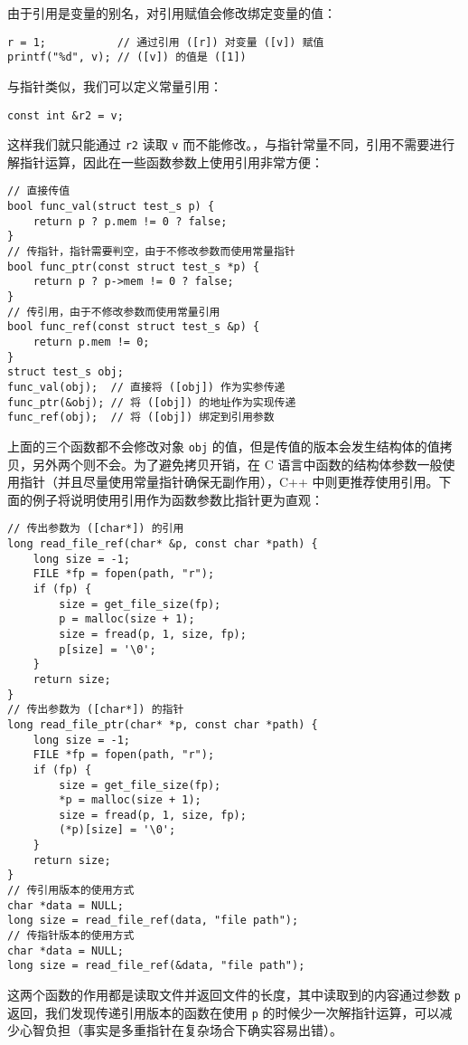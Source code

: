 \documentclass[hyperref,UTF8]{article}
\begin{document}
由于引用是变量的别名，对引用赋值会修改绑定变量的值：
\begin{lstlisting}
r = 1;           // 通过引用 ([r]) 对变量 ([v]) 赋值
printf("%d", v); // ([v]) 的值是 ([1])
\end{lstlisting}
与指针类似，我们可以定义常量引用：
\begin{lstlisting}[numbers=none]
const int &r2 = v;
\end{lstlisting}
这样我们就只能通过 \texttt{r2} 读取 \texttt{v} 而不能修改。，与指针常量不同，引用不需要进行解指针运算，因此在一些函数参数上使用引用非常方便：
\begin{lstlisting}
// 直接传值
bool func_val(struct test_s p) {
    return p ? p.mem != 0 ? false;
}
// 传指针，指针需要判空，由于不修改参数而使用常量指针
bool func_ptr(const struct test_s *p) {
    return p ? p->mem != 0 ? false;
}
// 传引用，由于不修改参数而使用常量引用
bool func_ref(const struct test_s &p) {
    return p.mem != 0;
}
struct test_s obj;
func_val(obj);  // 直接将 ([obj]) 作为实参传递
func_ptr(&obj); // 将 ([obj]) 的地址作为实现传递
func_ref(obj);  // 将 ([obj]) 绑定到引用参数
\end{lstlisting}
上面的三个函数都不会修改对象 \texttt{obj} 的值，但是传值的版本会发生结构体的值拷贝，另外两个则不会。为了避免拷贝开销，在 C 语言中函数的结构体参数一般使用指针（并且尽量使用常量指针确保无副作用），C++ 中则更推荐使用引用。下面的例子将说明使用引用作为函数参数比指针更为直观：
\begin{lstlisting}
// 传出参数为 ([char*]) 的引用
long read_file_ref(char* &p, const char *path) {
    long size = -1;
    FILE *fp = fopen(path, "r");
    if (fp) {
        size = get_file_size(fp);
        p = malloc(size + 1);
        size = fread(p, 1, size, fp);
        p[size] = '\0';
    }
    return size;
}
// 传出参数为 ([char*]) 的指针
long read_file_ptr(char* *p, const char *path) {
    long size = -1;
    FILE *fp = fopen(path, "r");
    if (fp) {
        size = get_file_size(fp);
        *p = malloc(size + 1);
        size = fread(p, 1, size, fp);
        (*p)[size] = '\0';
    }
    return size;
}
// 传引用版本的使用方式
char *data = NULL;
long size = read_file_ref(data, "file path");
// 传指针版本的使用方式
char *data = NULL;
long size = read_file_ref(&data, "file path");
\end{lstlisting}
这两个函数的作用都是读取文件并返回文件的长度，其中读取到的内容通过参数 \texttt{p} 返回，我们发现传递引用版本的函数在使用 \texttt{p} 的时候少一次解指针运算，可以减少心智负担（事实是多重指针在复杂场合下确实容易出错）。
\end{document}

